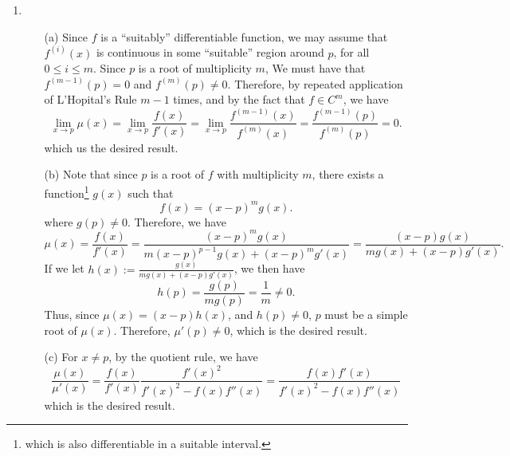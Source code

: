 \documentclass[12pt]{article}
\begin{document}
\begin{enumerate}[leftmargin=2em]
	\item
     \begin{enumerate}
	  \item[(a)] Since $f$ is a ``suitably'' differentiable function, we may assume that $f^{(i)}(x)$ is continuous in some ``suitable'' region around $p$, for all $0\leq i\leq m$. Since $p$ is a root of multiplicity $m$, 
		We must have that $f^{(m-1)}(p)=0$ and $f^{(m)}(p)\neq 0$. Therefore, by repeated application of L'Hopital's Rule $m-1$ times, and by the fact that $f\in C^m$, we have
		\[
		  \lim_{x\to p}\mu(x)=\lim_{x\to p} \frac{f(x)}{f'(x)} = \lim_{x\to p}\frac{f^{(m-1)}(x)}{f^{(m)}(x)}=\frac{f^{(m-1)}(p)}{f^{(m)}(p)}=0	
		.\] 
		which us the desired result.	
	  \item[(b)] Note that since $p$ is a root of $f$ with multiplicity $m$, there exists a function\footnote{which is also differentiable in a suitable interval.} $g(x)$ such that 
		  \[f(x)={(x-p)}^m g(x).\] 
		where $g(p)\neq 0$. Therefore, we have 
		  \[
		  \mu(x)=\frac{f(x)}{f'(x)}
		  =\frac{{(x-p)}^m g(x)}{m{(x-p)}^{p-1}g(x)+{(x-p)}^m g'(x)}=\frac{(x-p)g(x)}{mg(x)+(x-p)g'(x)}
	 	 .\] 
		 If we let $h(x):=\frac{g(x)}{mg(x)+(x-p)g'(x)}$, we then have
		 \[h(p)=\frac{g(p)}{mg(p)}=\frac{1}{m}\neq 0.\] 
		Thus, since $\mu(x)=(x-p)h(x)$, and $h(p)\neq 0$, $p$ must be a simple root of $\mu(x)$. Therefore, $\mu'(p)\neq 0$, which is the desired result. 
        \item[(c)] For $x\neq p$, by the quotient rule, we have 
		\[\frac{\mu(x)}{\mu'(x)}=\frac{f(x)}{f'(x)}\frac{{f'(x)}^2}{{f'(x)}^2-f(x)f''(x)}=\frac{f(x)f'(x)}{{f'(x)}^2-f(x)f''(x)}\]
		which is the desired result.
    \end{enumerate}   
        

\end{enumerate}
\end{document}
